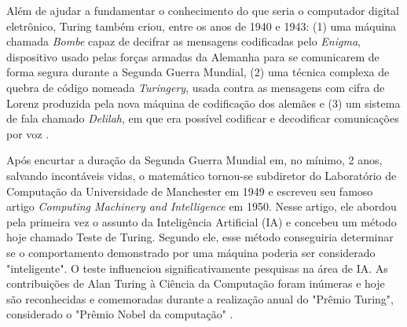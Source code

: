 \documentclass[
  12pt,     %
  openright,      %
  oneside,      %
  a4paper     %
  ]{abntex2}
\begin{document}
Além de ajudar a fundamentar o conhecimento do que seria o computador digital eletrônico, Turing também criou, entre os anos de 1940 e 1943: (1) uma máquina chamada \textit{Bombe} capaz de decifrar as mensagens codificadas pelo \textit{Enigma}, dispositivo usado pelas forças armadas da Alemanha para se comunicarem de forma segura durante a Segunda Guerra Mundial, (2) uma técnica complexa de quebra de código nomeada \textit{Turingery}, usada contra as mensagens com cifra de Lorenz produzida pela nova máquina de codificação dos alemães e (3) um sistema de fala chamado \textit{Delilah}, em que era possível codificar e decodificar comunicações por voz \cite{Gray1999}.

Após encurtar a duração da Segunda Guerra Mundial em, no mínimo, 2 anos, salvando incontáveis vidas, o matemático tornou-se subdiretor do Laboratório de Computação da Universidade de Manchester em 1949 e escreveu seu famoso artigo \textit{Computing Machinery and Intelligence} em 1950. Nesse artigo, ele abordou pela primeira vez o assunto da Inteligência Artificial (IA) e concebeu um método hoje chamado Teste de Turing. Segundo ele, esse método conseguiria determinar se o comportamento demonstrado por uma máquina poderia ser considerado "inteligente".  O teste influenciou significativamente pesquisas na área de IA. As contribuições de Alan Turing à Ciência da Computação foram inúmeras e hoje são reconhecidas e comemoradas durante a realização anual do "Prêmio Turing", considerado o "Prêmio Nobel da computação" \cite{Gray1999}.

\chapter*{}

\end{document}
